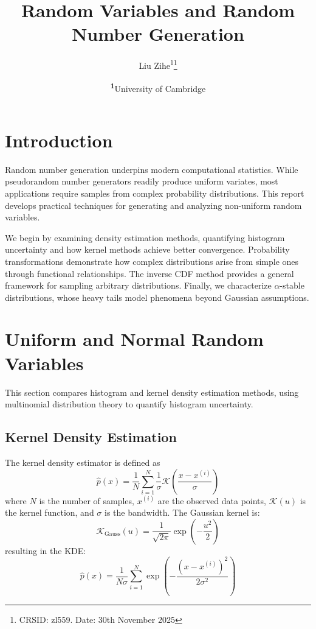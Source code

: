 \documentclass[
	a4paper, %
	10pt, %
	twoside, %
]{LTJournalArticle}
\title{Random Variables and Random Number Generation} %
\author{%
	Liu Zihe\textsuperscript{1}\thanks{CRSID: zl559. Date: 30th November 2025}
}
\date{\footnotesize\textsuperscript{\textbf{1}}University of Cambridge}
\begin{document}
\maketitle %


\section{Introduction}

Random number generation underpins modern computational statistics. While pseudorandom number generators readily produce uniform variates, most applications require samples from complex probability distributions. This report develops practical techniques for generating and analyzing non-uniform random variables.

We begin by examining density estimation methods, quantifying histogram uncertainty and how kernel methods achieve better convergence. Probability transformations demonstrate how complex distributions arise from simple ones through functional relationships. The inverse CDF method provides a general framework for sampling arbitrary distributions. Finally, we characterize $\alpha$-stable distributions, whose heavy tails model phenomena beyond Gaussian assumptions.


\section{Uniform and Normal Random Variables}
\label{sec:uniform_normal}

This section compares histogram and kernel density estimation methods, using multinomial distribution theory to quantify histogram uncertainty.

\subsection{Kernel Density Estimation}

The kernel density estimator is defined as
\begin{equation}
	\hat{p}(x) = \frac{1}{N}\sum_{i=1}^{N} \frac{1}{\sigma}\mathcal{K}\left(\frac{x - x^{(i)}}{\sigma}\right)
\end{equation}
where $N$ is the number of samples, $x^{(i)}$ are the observed data points, $\mathcal{K}(u)$ is the kernel function, and $\sigma$ is the bandwidth. The Gaussian kernel is:
\begin{equation}
	\mathcal{K}_{\text{Gauss}}(u) = \frac{1}{\sqrt{2\pi}}\exp\left(-\frac{u^2}{2}\right)
\end{equation}
resulting in the KDE:
\begin{equation}
	\hat{p}(x) = \frac{1}{N\sigma}\sum_{i=1}^{N}\exp\left(-\frac{(x - x^{(i)})^2}{2\sigma^2}\right)
\end{equation}
\end{document}
